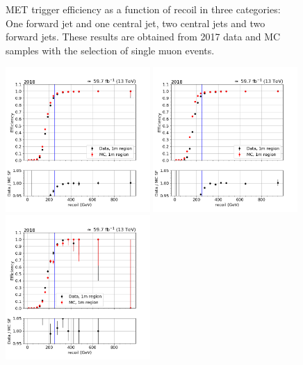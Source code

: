 \begin{figure}[htp]
\begin{center}
    \end{center}
    \caption{MET trigger efficiency as a function of recoil in three categories: One forward jet and one central jet, two central jets and
            two forward jets. These results are obtained from 2017 data and MC samples with the selection of single muon events.} 
    \label{fig:eff_recoil_2017_1m}
\end{figure}

\begin{figure}[hbp]
    \begin{center}
        \includegraphics[width=0.49\textwidth]{fig/efficiency/trigger/met/recoil/data_mc_comparison_1m_2018_one_jet_forward_one_jet_central.png}
        \includegraphics[width=0.49\textwidth]{fig/efficiency/trigger/met/recoil/data_mc_comparison_1m_2018_two_central_jets.png} \\
        \includegraphics[width=0.49\textwidth]{fig/efficiency/trigger/met/recoil/data_mc_comparison_1m_2018_two_forward_jets.png}

\end{center}
\end{figure}
